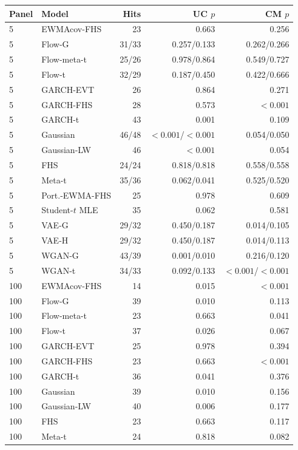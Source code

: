 \documentclass[11pt]{article}
\theoremstyle{definition}\newtheorem{definition}[theorem]{Definition}
\theoremstyle{remark}\newtheorem{remark}[theorem]{Remark}
\begin{document}
\begin{table}[htbp]
\centering\footnotesize
\setlength{\tabcolsep}{4pt}
\begin{tabular}{llrrr}
\toprule
Panel & Model & Hits & UC $p$ & CM $p$ \\
\midrule
5 & EWMAcov-FHS & 23 & 0.663 & 0.256 \\
5 & Flow-G & 31/33 & 0.257/0.133 & 0.262/0.266 \\
5 & Flow-meta-t & 25/26 & 0.978/0.864 & 0.549/0.727 \\
5 & Flow-t & 32/29 & 0.187/0.450 & 0.422/0.666 \\
5 & GARCH-EVT & 26 & 0.864 & 0.271 \\
5 & GARCH-FHS & 28 & 0.573 & $<0.001$ \\
5 & GARCH-t & 43 & 0.001 & 0.109 \\
5 & Gaussian & 46/48 & $<0.001$/$<0.001$ & 0.054/0.050 \\
5 & Gaussian-LW & 46 & $<0.001$ & 0.054 \\
5 & FHS & 24/24 & 0.818/0.818 & 0.558/0.558 \\
5 & Meta-t & 35/36 & 0.062/0.041 & 0.525/0.520 \\
5 & Port.-EWMA-FHS & 25 & 0.978 & 0.609 \\
5 & Student-$t$ MLE & 35 & 0.062 & 0.581 \\
5 & VAE-G & 29/32 & 0.450/0.187 & 0.014/0.105 \\
5 & VAE-H & 29/32 & 0.450/0.187 & 0.014/0.113 \\
5 & WGAN-G & 43/39 & 0.001/0.010 & 0.216/0.120 \\
5 & WGAN-t & 34/33 & 0.092/0.133 & $<0.001$/$<0.001$ \\
100 & EWMAcov-FHS & 14 & 0.015 & $<0.001$ \\
100 & Flow-G & 39 & 0.010 & 0.113 \\
100 & Flow-meta-t & 23 & 0.663 & 0.041 \\
100 & Flow-t & 37 & 0.026 & 0.067 \\
100 & GARCH-EVT & 25 & 0.978 & 0.394 \\
100 & GARCH-FHS & 23 & 0.663 & $<0.001$ \\
100 & GARCH-t & 36 & 0.041 & 0.376 \\
100 & Gaussian & 39 & 0.010 & 0.156 \\
100 & Gaussian-LW & 40 & 0.006 & 0.177 \\
100 & FHS & 23 & 0.663 & 0.117 \\
100 & Meta-t & 24 & 0.818 & 0.082 \\

\end{tabular}
\end{table}
\end{document}
